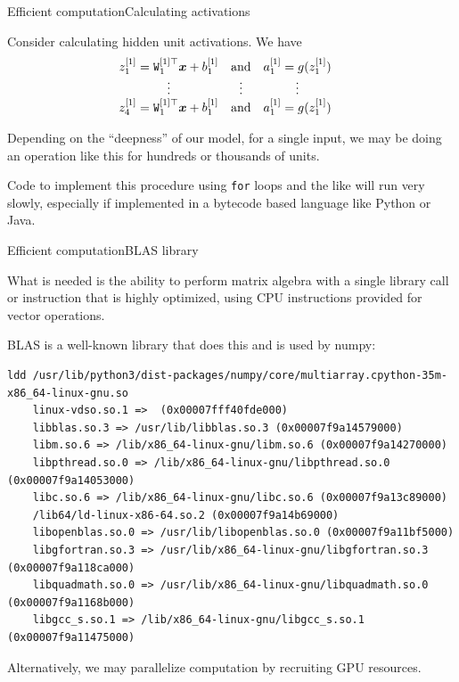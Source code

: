 \documentclass{beamer}
\renewcommand{\vec}[1]{\boldsymbol{#1}}
\newcommand{\mat}[1]{\mathtt{#1}}
\begin{document}
\begin{frame}{Efficient computation}{Calculating activations}

  Consider calculating hidden unit activations. We have
  $$\begin{matrix}
    z_1^{[1]} = \mat{W}_1^{[1]\top}\vec{x} + b_1^{[1]} & \text{and} & a_1^{[1]} = g(z_1^{[1]}) & \hfill \\
    \vdots & \vdots & \vdots & \hfill \\
    z_4^{[1]} = \mat{W}_1^{[1]\top}\vec{x} + b_1^{[1]} & \text{and} & a_1^{[1]} = g(z_1^{[1]}) & \hfill
  \end{matrix}$$

  Depending on the ``deepness'' of our model, for a single input, we
  may be doing an operation like this for hundreds or thousands of
  units.

  \medskip

  Code to implement this procedure using \texttt{for} loops and the
  like will run \alert{very slowly}, especially if implemented in a
  bytecode based language like Python or Java.

\end{frame}

  
\begin{frame}[fragile]{Efficient computation}{BLAS library}

  What is needed is the ability to perform matrix algebra with a
  single library call or instruction that is highly optimized, using
  CPU instructions provided for \alert{vector operations}.

  \medskip
  
  \alert{BLAS} is a well-known library that does this and is used by
  numpy:

\begin{tiny}
\begin{verbatim}
ldd /usr/lib/python3/dist-packages/numpy/core/multiarray.cpython-35m-x86_64-linux-gnu.so
	linux-vdso.so.1 =>  (0x00007fff40fde000)
	libblas.so.3 => /usr/lib/libblas.so.3 (0x00007f9a14579000)
	libm.so.6 => /lib/x86_64-linux-gnu/libm.so.6 (0x00007f9a14270000)
	libpthread.so.0 => /lib/x86_64-linux-gnu/libpthread.so.0 (0x00007f9a14053000)
	libc.so.6 => /lib/x86_64-linux-gnu/libc.so.6 (0x00007f9a13c89000)
	/lib64/ld-linux-x86-64.so.2 (0x00007f9a14b69000)
	libopenblas.so.0 => /usr/lib/libopenblas.so.0 (0x00007f9a11bf5000)
	libgfortran.so.3 => /usr/lib/x86_64-linux-gnu/libgfortran.so.3 (0x00007f9a118ca000)
	libquadmath.so.0 => /usr/lib/x86_64-linux-gnu/libquadmath.so.0 (0x00007f9a1168b000)
	libgcc_s.so.1 => /lib/x86_64-linux-gnu/libgcc_s.so.1 (0x00007f9a11475000)
\end{verbatim}
\end{tiny}

  \medskip

  Alternatively, we may parallelize computation by recruiting GPU resources.

\end{frame}
\end{document}
